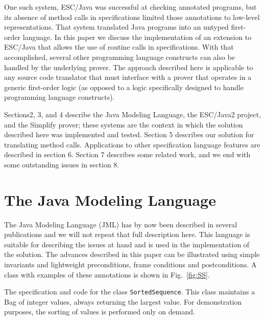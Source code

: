 \documentclass{sig-alternate}
\begin{document}
One such system,
ESC/Java \cite{ESCJava} was successful at checking annotated programs, but its
absence of method calls in specifications limited those annotations to
low-level representations.  That system translated Java programs into
an untyped first-order language.  In this paper we discuss the implementation
of an extension to ESC/Java that allows the use of routine calls in
specifications.  With that accomplished, several other programming
language constructs can also be handled by the underlying prover.
The approach described here is applicable to any source code translator
that must interface with a prover that operates in a generic first-order 
logic (as opposed to a logic specifically designed to handle programming language
constructs).

Sections2, 3, and 4 describe the Java Modeling
Language, the ESC/Java2 project, and the Simplify prover; these systems
are the context in which the solution described here was implemented 
and tested.  Section 5 describes our solution for translating method calls.
Applications to other specification language features are described in section 6.
Section 7 describes some related work,
and we end with some outstanding issues in section 8.


\section{The Java Modeling Language}

The Java Modeling Language (JML) has by now been described in several publications
\cite{jmlpapers,Leavens-Baker-Ruby99b,Leavens-Baker-Ruby02} and we will not repeat that full description here.  This language is suitable for
describing the issues at hand and is used in the implementation of the solution.
 The advances described in this paper
can be illustrated using simple invariants and lightweight preconditions,
frame conditions and postconditions.  
A class with examples of these annotations is shown in Fig.~\ref{fig:SS}.

\begin{BFIGURE}

\caption{The specification and code for the class \texttt{SortedSequence}.  This class maintains a Bag of integer values, always returning the largest value.  For demonstration purposes, 
the sorting of values is performed only on demand.}
\label{fig:SS}
\end{BFIGURE}
\end{document}
